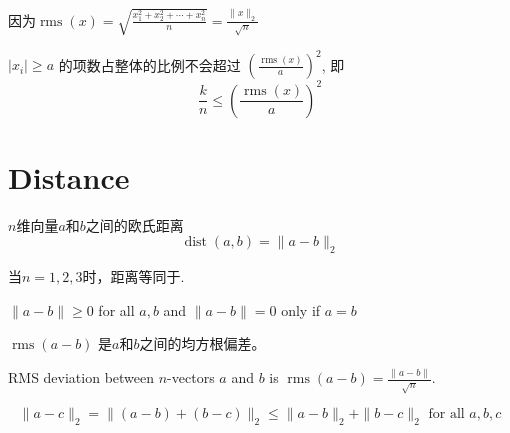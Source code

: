 \begin{corollary}
    因为$ \operatorname{rms}(x)=\sqrt{\frac{x_{1}^{2}+x_{2}^{2}+\cdots+x_{n}^{2}}{n}}=\frac{\|x\|_{2}}{\sqrt{n}} $

    $ \left|x_{i}\right| \geq a $ 的项数占整体的比例不会超过 $ \left(\frac{\operatorname{rms}(x)}{a}\right)^{2} $, 即 \begin{equation} \frac{k}{n} \leq\left(\frac{\operatorname{rms}(x)}{a}\right)^{2} \end{equation}
\end{corollary}

\section{Distance}

\begin{definition}
    $n$维向量$a$和$b$之间的欧氏距离
    \begin{equation} \operatorname{dist}(a, b)=\|a-b\|_{2} \end{equation}
\end{definition}

当$n=1,2,3$时，距离等同于.

\begin{theorem}
    $ \|a-b\| \geq 0 $ for all $ a, b $ and $ \|a-b\|=0 $ only if $ a=b $
\end{theorem}

\begin{definition}
    $ \operatorname{rms}(a-b) $ 是$a$和$b$之间的均方根偏差。
\end{definition}

\begin{corollary}
    RMS deviation between $ n $-vectors $ a $ and $ b $ is $ \operatorname{rms}(a-b)=\frac{\|a-b\|}{\sqrt{n}} $.
\end{corollary}

\begin{theorem}
    \begin{equation} \|a-c\|_{2}=\|(a-b)+(b-c)\|_{2} \leq\|a-b\|_{2}+\|b-c\|_{2} \text{ for all } a, b, c \end{equation}
\end{theorem}

